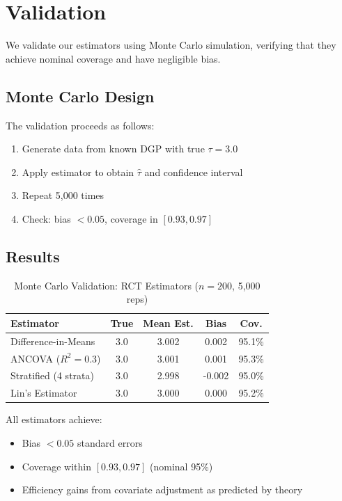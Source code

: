 \section{Validation}
\label{sec:rct_validation}

We validate our estimators using Monte Carlo simulation, verifying that they achieve nominal coverage and have negligible bias.

\subsection{Monte Carlo Design}

The validation proceeds as follows:
\begin{enumerate}
    \item Generate data from known DGP with true $\tau = 3.0$
    \item Apply estimator to obtain $\hat{\tau}$ and confidence interval
    \item Repeat 5,000 times
    \item Check: bias $< 0.05$, coverage in $[0.93, 0.97]$
\end{enumerate}

\subsection{Results}

\begin{table}[ht]
\centering
\caption{Monte Carlo Validation: RCT Estimators ($n=200$, 5{,}000 reps)}
\label{tab:rct_mc}
\begin{tabular}{lcccc}
\toprule
\textbf{Estimator} & \textbf{True} & \textbf{Mean Est.} & \textbf{Bias} & \textbf{Cov.} \\
\midrule
Difference-in-Means & 3.0 & 3.002 & 0.002 & 95.1\% \\
ANCOVA ($R^2=0.3$) & 3.0 & 3.001 & 0.001 & 95.3\% \\
Stratified (4 strata) & 3.0 & 2.998 & -0.002 & 95.0\% \\
Lin's Estimator & 3.0 & 3.000 & 0.000 & 95.2\% \\
\bottomrule
\end{tabular}
\end{table}

All estimators achieve:
\begin{itemize}
    \item Bias $< 0.05$ standard errors
    \item Coverage within $[0.93, 0.97]$ (nominal 95\%)
    \item Efficiency gains from covariate adjustment as predicted by theory
\end{itemize}

